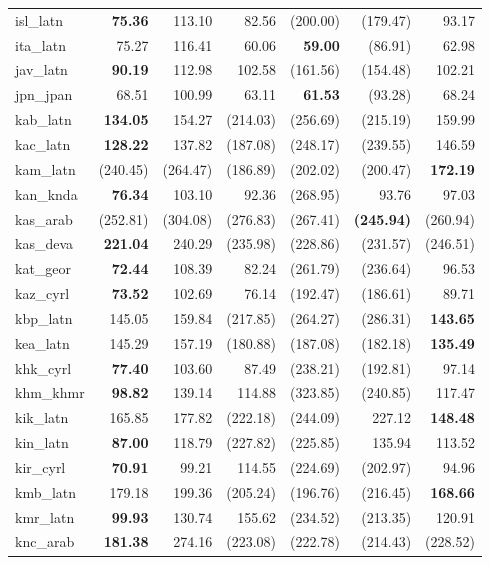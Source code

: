 \documentclass[11pt]{article}
\begin{document}
\begin{center}
\begin{longtable}[width=0.9\textwidth]{|l|rrrrrr|}
isl\_latn & \textbf{75.36} & 113.10 & 82.56 & (200.00) & (179.47) & 93.17 \\ 
ita\_latn & 75.27 & 116.41 & 60.06 & \textbf{59.00} & (86.91) & 62.98 \\ 
jav\_latn & \textbf{90.19} & 112.98 & 102.58 & (161.56) & (154.48) & 102.21 \\ 
jpn\_jpan & 68.51 & 100.99 & 63.11 & \textbf{61.53} & (93.28) & 68.24 \\ 
kab\_latn & \textbf{134.05} & 154.27 & (214.03) & (256.69) & (215.19) & 159.99 \\ 
kac\_latn & \textbf{128.22} & 137.82 & (187.08) & (248.17) & (239.55) & 146.59 \\ 
kam\_latn & (240.45) & (264.47) & (186.89) & (202.02) & (200.47) & \textbf{172.19} \\ 
kan\_knda & \textbf{76.34} & 103.10 & 92.36 & (268.95) & 93.76 & 97.03 \\ 
kas\_arab & (252.81) & (304.08) & (276.83) & (267.41) & \textbf{(245.94)} & (260.94) \\ 
kas\_deva & \textbf{221.04} & 240.29 & (235.98) & (228.86) & (231.57) & (246.51) \\ 
kat\_geor & \textbf{72.44} & 108.39 & 82.24 & (261.79) & (236.64) & 96.53 \\ 
kaz\_cyrl & \textbf{73.52} & 102.69 & 76.14 & (192.47) & (186.61) & 89.71 \\ 
kbp\_latn & 145.05 & 159.84 & (217.85) & (264.27) & (286.31) & \textbf{143.65} \\ 
kea\_latn & 145.29 & 157.19 & (180.88) & (187.08) & (182.18) & \textbf{135.49} \\ 
khk\_cyrl & \textbf{77.40} & 103.60 & 87.49 & (238.21) & (192.81) & 97.14 \\ 
khm\_khmr & \textbf{98.82} & 139.14 & 114.88 & (323.85) & (240.85) & 117.47 \\ 
kik\_latn & 165.85 & 177.82 & (222.18) & (244.09) & 227.12 & \textbf{148.48} \\ 
kin\_latn & \textbf{87.00} & 118.79 & (227.82) & (225.85) & 135.94 & 113.52 \\ 
kir\_cyrl & \textbf{70.91} & 99.21 & 114.55 & (224.69) & (202.97) & 94.96 \\ 
kmb\_latn & 179.18 & 199.36 & (205.24) & (196.76) & (216.45) & \textbf{168.66} \\ 
kmr\_latn & \textbf{99.93} & 130.74 & 155.62 & (234.52) & (213.35) & 120.91 \\ 
knc\_arab & \textbf{181.38} & 274.16 & (223.08) & (222.78) & (214.43) & (228.52) \\ 

\end{longtable}
\end{center}
\end{document}
